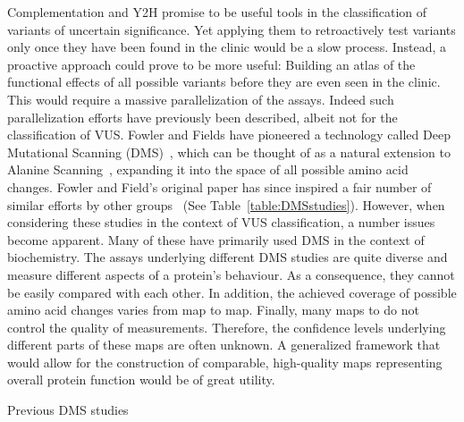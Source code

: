 Complementation and Y2H promise to be useful tools in the classification of variants of uncertain significance. Yet applying them to retroactively test variants only once they have been found in the clinic would be a slow process. Instead, a proactive approach could prove to be more useful: Building an atlas of the functional effects of all possible variants before they are even seen in the clinic. This would require a massive parallelization of the assays. Indeed such parallelization efforts have previously been described, albeit not for the classification of VUS. Fowler and Fields have pioneered a technology called Deep Mutational Scanning (DMS)~\cite{fowler_high-resolution_2010}, which can be thought of as a natural extension to Alanine Scanning~\cite{cunningham_high-resolution_1989}, expanding it into the space of all possible amino acid changes. Fowler and Field's original paper has since inspired a fair number of similar efforts by other groups~\cite{ernst_coevolution_2010,fujino_robust_2012,adkar_protein_2012,mclaughlin_jr_spatial_2012,schlinkmann_critical_2012,whitehead_optimization_2012,traxlmayr_construction_2012,wu_systematic_2013,roscoe_analyses_2013,starita_activity-enhancing_2013,procko_computational_2013,tinberg_computational_2013,jiang_latent_2013,kim_high-throughput_2013,melamed_deep_2013,forsyth_deep_2013,wagenaar_resistance_2014,firnberg_comprehensive_2014,olson_comprehensive_2014,melnikov_comprehensive_2014,thyagarajan_inherent_2014,stiffler_evolvability_2015,doud_site-specific_2015,kitzman_massively_2015,starita_massively_2015,mishra_systematic_2016,doud_accurate_2016,mavor_determination_2016} (See Table~\ref{table:DMSstudies}). However, when considering these studies in the context of VUS classification, a number issues become apparent. Many of these have primarily used DMS in the context of biochemistry. The assays underlying different DMS studies are quite diverse and measure different aspects of a protein’s behaviour. As a consequence, they cannot be easily compared with each other. In addition, the achieved coverage of possible amino acid changes varies from map to map. Finally, many maps to do not control the quality of measurements. Therefore, the confidence levels underlying different parts of these maps are often unknown. A generalized framework that would allow for the construction of comparable, high-quality maps representing overall protein function would be of great utility.


\begin{landscape}
\begin{table}
	\centering
	\caption{Previous DMS studies}
	\label{table:DMSstudies}
	
\end{table}
\end{landscape}


